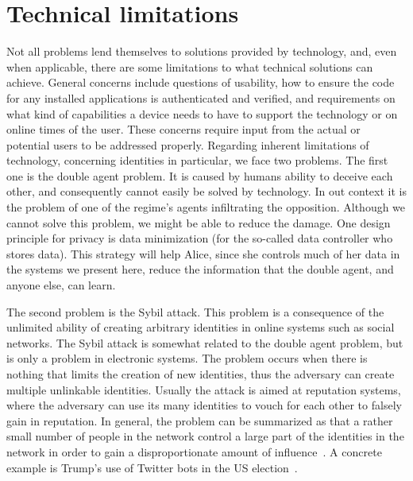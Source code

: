 \section{Technical limitations}
\label{TechnicalLimitations}

Not all problems lend themselves to solutions provided by technology,
and, even when applicable, there are some 
limitations to what technical solutions can achieve. General concerns include
questions of usability, how to ensure the code for any installed
applications is authenticated and verified, and requirements on what kind
of capabilities a device needs to have to support the technology or on
online times of the user. These concerns require input from the actual
or potential users to be addressed properly. Regarding inherent
limitations of technology, concerning identities in particular, we face two problems.
The first one is the double agent problem.
It is caused by humans ability to deceive each other, and consequently cannot 
easily be solved by technology.
\label{DoubleAgentProblem}
In out context it is the problem of one of the regime's agents
infiltrating the opposition.
Although we cannot solve this problem, we might be able to reduce the
damage.  One design principle for privacy is data minimization (for
the so-called data controller who stores data). This strategy will
help Alice, since she controls much of her data in the systems we
present here, reduce the information that the double agent, and anyone
else, can learn.

The second problem is the Sybil attack.
This problem is a consequence of the unlimited ability of creating arbitrary 
identities in online systems such as social networks.
\label{SybilAttacks}
The Sybil attack is somewhat related to the double agent problem, but is only 
a problem in electronic systems.
The problem occurs when there is nothing that limits the creation of new 
identities, thus the adversary can create multiple unlinkable identities.
Usually the attack is aimed at reputation systems, where the adversary can use 
its many identities to vouch for each other to falsely gain in reputation.
In general, the problem can be summarized as that a rather small number of 
people in the network control a large part of the identities in the network in 
order to gain a disproportionate amount of influence~\cite{SybilAttack}.
A concrete example is Trump's use of Twitter bots in the US 
election~\cite{BotsAndAutomationDuringUSElection}.

